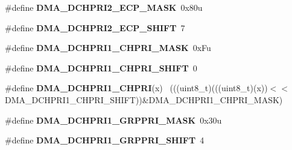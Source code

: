 \begin{DoxyCompactItemize}
\item 
\hypertarget{group___d_m_a___register___masks_ga5d73d5f6aae29465206f72cda9bccde6}{}\#define {\bfseries D\+M\+A\+\_\+\+D\+C\+H\+P\+R\+I2\+\_\+\+E\+C\+P\+\_\+\+M\+A\+S\+K}~0x80u\label{group___d_m_a___register___masks_ga5d73d5f6aae29465206f72cda9bccde6}

\item 
\hypertarget{group___d_m_a___register___masks_ga139a8b64a74b8009c858a68687a388aa}{}\#define {\bfseries D\+M\+A\+\_\+\+D\+C\+H\+P\+R\+I2\+\_\+\+E\+C\+P\+\_\+\+S\+H\+I\+F\+T}~7\label{group___d_m_a___register___masks_ga139a8b64a74b8009c858a68687a388aa}

\item 
\hypertarget{group___d_m_a___register___masks_ga5a655b5899c5da64b36029329ff25fb8}{}\#define {\bfseries D\+M\+A\+\_\+\+D\+C\+H\+P\+R\+I1\+\_\+\+C\+H\+P\+R\+I\+\_\+\+M\+A\+S\+K}~0x\+Fu\label{group___d_m_a___register___masks_ga5a655b5899c5da64b36029329ff25fb8}

\item 
\hypertarget{group___d_m_a___register___masks_ga3270315532805b61a878d4ab0e96045f}{}\#define {\bfseries D\+M\+A\+\_\+\+D\+C\+H\+P\+R\+I1\+\_\+\+C\+H\+P\+R\+I\+\_\+\+S\+H\+I\+F\+T}~0\label{group___d_m_a___register___masks_ga3270315532805b61a878d4ab0e96045f}

\item 
\hypertarget{group___d_m_a___register___masks_ga476ba151713a8f278b54d3a1707089b8}{}\#define {\bfseries D\+M\+A\+\_\+\+D\+C\+H\+P\+R\+I1\+\_\+\+C\+H\+P\+R\+I}(x)                                      ~(((uint8\+\_\+t)(((uint8\+\_\+t)(x))$<$$<$D\+M\+A\+\_\+\+D\+C\+H\+P\+R\+I1\+\_\+\+C\+H\+P\+R\+I\+\_\+\+S\+H\+I\+F\+T))\&D\+M\+A\+\_\+\+D\+C\+H\+P\+R\+I1\+\_\+\+C\+H\+P\+R\+I\+\_\+\+M\+A\+S\+K)\label{group___d_m_a___register___masks_ga476ba151713a8f278b54d3a1707089b8}

\item 
\hypertarget{group___d_m_a___register___masks_ga127060b5a31ad685c195f403188e40d0}{}\#define {\bfseries D\+M\+A\+\_\+\+D\+C\+H\+P\+R\+I1\+\_\+\+G\+R\+P\+P\+R\+I\+\_\+\+M\+A\+S\+K}~0x30u\label{group___d_m_a___register___masks_ga127060b5a31ad685c195f403188e40d0}

\item 
\hypertarget{group___d_m_a___register___masks_ga11359860fa3933ea24859e6d7a13c7ed}{}\#define {\bfseries D\+M\+A\+\_\+\+D\+C\+H\+P\+R\+I1\+\_\+\+G\+R\+P\+P\+R\+I\+\_\+\+S\+H\+I\+F\+T}~4\label{group___d_m_a___register___masks_ga11359860fa3933ea24859e6d7a13c7ed}


\end{DoxyCompactItemize}

